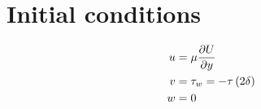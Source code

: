 \newpage
\appendix

\section{Initial conditions}

\begin{equation}
\label{Initial conditions}
\begin{split}
u &= \mu \frac{\partial U}{\partial y}\\
v &= \tau_w  = -\tau\left(2\delta\right)\\
w &= 0\\
\end{split}
\end{equation}\\
